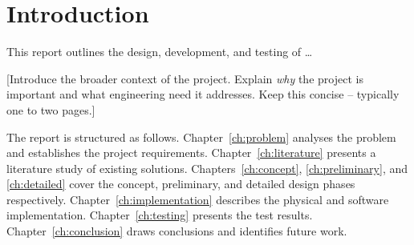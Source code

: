 \chapter{Introduction}
\label{ch:introduction}

This report outlines the design, development, and testing of \ldots{}

[Introduce the broader context of the project. Explain \textit{why} the
project is important and what engineering need it addresses. Keep this
concise – typically one to two pages.]

The report is structured as follows.
Chapter~\ref{ch:problem} analyses the problem and establishes the
project requirements.
Chapter~\ref{ch:literature} presents a literature study of existing
solutions.
Chapters~\ref{ch:concept}, \ref{ch:preliminary}, and \ref{ch:detailed}
cover the concept, preliminary, and detailed design phases respectively.
Chapter~\ref{ch:implementation} describes the physical and software
implementation.
Chapter~\ref{ch:testing} presents the test results.
Chapter~\ref{ch:conclusion} draws conclusions and identifies future work.
